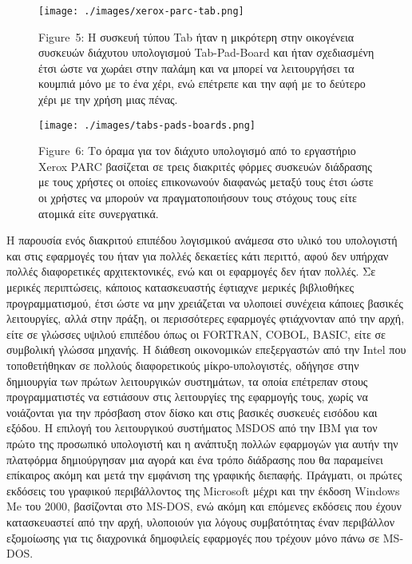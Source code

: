\documentclass[
]{article}
\begin{document}
\leavevmode{}%
\begin{figure}
\hypertarget{fig:xerox-parc-tab}{%
\centering
\texttt{[image: ./images/xerox-parc-tab.png]}
\caption{Figure~5: Η συσκευή τύπου Tab ήταν η μικρότερη στην οικογένεια
συσκευών διάχυτου υπολογισμού Tab-Pad-Board και ήταν σχεδιασμένη έτσι
ώστε να χωράει στην παλάμη και να μπορεί να λειτουργήσει τα κουμπιά μόνο
με το ένα χέρι, ενώ επέτρεπε και την αφή με το δεύτερο χέρι με την χρήση
μιας πένας.}\label{fig:xerox-parc-tab}
}
\end{figure}

\leavevmode{}%
\begin{figure}
\hypertarget{fig:tabs-pads-boards}{%
\centering
\texttt{[image: ./images/tabs-pads-boards.png]}
\caption{Figure~6: Το όραμα για τον διάχυτο υπολογισμό από το εργαστήριο
Xerox PARC βασίζεται σε τρεις διακριτές φόρμες συσκευών διάδρασης με
τους χρήστες οι οποίες επικονωνούν διαφανώς μεταξύ τους έτσι ώστε οι
χρήστες να μπορούν να πραγματοποιήσουν τους στόχους τους είτε ατομικά
είτε συνεργατικά.}\label{fig:tabs-pads-boards}
}
\end{figure}

Η παρουσία ενός διακριτού επιπέδου λογισμικού ανάμεσα στο υλικό του
υπολογιστή και στις εφαρμογές του ήταν για πολλές δεκαετίες κάτι
περιττό, αφού δεν υπήρχαν πολλές διαφορετικές αρχιτεκτονικές, ενώ και οι
εφαρμογές δεν ήταν πολλές. Σε μερικές περιπτώσεις, κάποιος κατασκευαστής
έφτιαχνε μερικές βιβλιοθήκες προγραμματισμού, έτσι ώστε να μην
χρειάζεται να υλοποιεί συνέχεια κάποιες βασικές λειτουργίες, αλλά στην
πράξη, οι περισσότερες εφαρμογές φτιάχνονταν από την αρχή, είτε σε
γλώσσες υψιλού επιπέδου όπως οι FORTRAN, COBOL, BASIC, είτε σε συμβολική
γλώσσα μηχανής. Η διάθεση οικονομικών επεξεργαστών από την Intel που
τοποθετήθηκαν σε πολλούς διαφορετικούς μίκρο-υπολογιστές, οδήγησε στην
δημιουργία των πρώτων λειτουργικών συστημάτων, τα οποία επέτρεπαν στους
προγραμματιστές να εστιάσουν στις λειτουργίες της εφαρμογής τους, χωρίς
να νοιάζονται για την πρόσβαση στον δίσκο και στις βασικές συσκευές
εισόδου και εξόδου. Η επιλογή του λειτουργικού συστήματος MSDOS από την
IBM για τον πρώτο της προσωπικό υπολογιστή και η ανάπτυξη πολλών
εφαρμογών για αυτήν την πλατφόρμα δημιούργησαν μια αγορά και ένα τρόπο
διάδρασης που θα παραμείνει επίκαιρος ακόμη και μετά την εμφάνιση της
γραφικής διεπαφής. Πράγματι, οι πρώτες εκδόσεις του γραφικού
περιβάλλοντος της Microsoft μέχρι και την έκδοση Windows Me του 2000,
βασίζονται στο MS-DOS, ενώ ακόμη και επόμενες εκδόσεις που έχουν
κατασκευαστεί από την αρχή, υλοποιούν για λόγους συμβατότητας έναν
περιβάλλον εξομοίωσης για τις διαχρονικά δημοφιλείς εφαρμογές που
τρέχουν μόνο πάνω σε MS-DOS.
\end{document}
